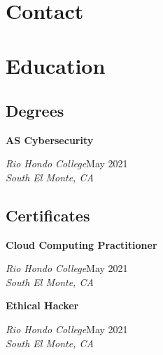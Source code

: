 \documentclass[a4paper]{article}
\begin{document}
\begin{minipage}[t]{0.36\textwidth}
    \raggedright
    \vspace*{0pt}
    {\bfseries\LARGE\textsf\appfirstname{}} \\
    {\bfseries\LARGE\textsf\applastname{}}

    \section{Contact}
    \vbox{
    }

    \section{Education}
    \subsection{Degrees}
    \textbf{AS Cybersecurity}\par
    \textit{Rio Hondo College}\hfill May 2021 \\
    \textit{South El Monte, CA}

    \subsection{Certificates}
    \textbf{Cloud Computing Practitioner}\par
    \textit{Rio Hondo College}\hfill May 2021 \\
    \textit{South El Monte, CA}

    \textbf{Ethical Hacker}\par
    \textit{Rio Hondo College}\hfill May 2021 \\
    \textit{South El Monte, CA}
\end{minipage}\hfill
\end{document}
